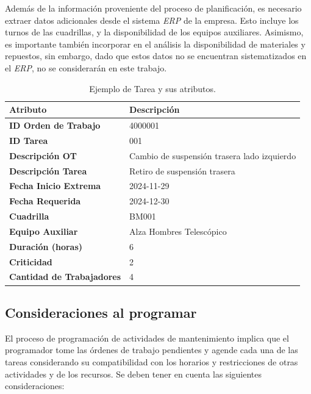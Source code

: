 \documentclass{article}
\begin{document}
Además de la información proveniente del proceso de planificación, es necesario extraer datos adicionales desde el sistema \textit{ERP} de la empresa. Esto incluye los turnos de las cuadrillas, y la disponibilidad de los equipos auxiliares. Asimismo, es importante también incorporar en el análisis la disponibilidad de materiales y repuestos, sin embargo, dado que estos datos no se encuentran sistematizados en el \textit{ERP}, no se considerarán en este trabajo.


\begin{table}[htbp]
    \centering
    \captionsetup{justification=centering}
    \vspace{0.5cm}
    \begin{tabular}{p{6cm} p{8cm}}
        \toprule
        \textbf{Atributo} & \textbf{Descripción} \\
        \midrule
        \textbf{ID Orden de Trabajo} & 4000001 \\
        \textbf{ID Tarea} & 001 \\
        \textbf{Descripción OT} & Cambio de suspensión trasera lado izquierdo \\
        \textbf{Descripción Tarea} & Retiro de suspensión trasera \\
        \textbf{Fecha Inicio Extrema} & 2024-11-29 \\
        \textbf{Fecha Requerida} & 2024-12-30 \\
        \textbf{Cuadrilla} & BM001 \\
        \textbf{Equipo Auxiliar} & Alza Hombres Telescópico \\
        \textbf{Duración (horas)} & 6 \\
        \textbf{Criticidad} & 2 \\
        \textbf{Cantidad de Trabajadores} & 4 \\
        \bottomrule
    \end{tabular}
    \caption{Ejemplo de Tarea y sus atributos.}
    \label{table:task}
\end{table}


\subsection{Consideraciones al programar}
El proceso de programación de actividades de mantenimiento implica que el programador tome las órdenes de trabajo pendientes y agende cada una de las tareas considerando su compatibilidad con los horarios y restricciones de otras actividades y de los recursos. Se deben tener en cuenta las siguientes consideraciones:
\end{document}
